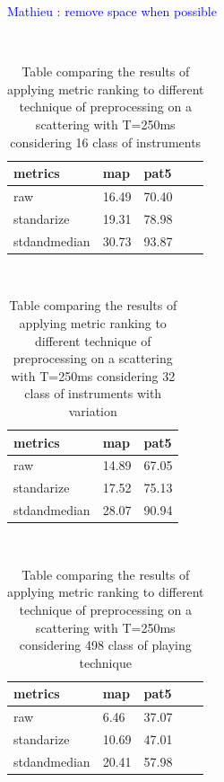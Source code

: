 \documentclass[hidelinks,12pt]{report}
\newcommand{\ml}[1]{\textcolor{blue}{ Mathieu : #1}}
\begin{document}
\ml{remove space when possible}

\begin{table} [H]
\begin{center} 
\ 
 \setlength{\tabcolsep}{.16667em} 
\begin{tabular}{ | l | l | l | l | l |}
metrics & map & pat5  \\ 
\hline 
raw & 16.49 & 70.40  \\ 
standarize & 19.31 & 78.98 \\ 
stdandmedian & 30.73 & 93.87 \\ 
 
\end{tabular} 
\end{center} 
\caption{Table comparing the results of applying metric ranking to different technique of preprocessing on a scattering with T=250ms considering 16 class of instruments} 
\label{you} 
\end{table}

\begin{table}[H]
\begin{center} 
\ 
 \setlength{\tabcolsep}{.16667em} 
\begin{tabular}{|l|l|l|} 
metrics & map & pat5  \\ 
\hline 
raw & 14.89 & 67.05 \\ 
standarize & 17.52 & 75.13  \\ 
stdandmedian & 28.07 & 90.94  \\ 

\end{tabular} 
\end{center} 
\caption{Table comparing the results of applying metric ranking to different technique of preprocessing on a scattering with T=250ms considering 32 class of instruments with variation} 
\label{you} 
\end{table} 


\begin{table} [H]
\begin{center} 
\ 
 \setlength{\tabcolsep}{.16667em} 
\begin{tabular}{ | l | l | l | l | l | }
metrics & map & pat5  \\ 
\hline 
raw &  6.46 & 37.07  \\ 
standarize & 10.69 & 47.01  \\ 
stdandmedian & 20.41 & 57.98  \\ 
\end{tabular} 
\end{center}
\caption{Table comparing the results of applying metric ranking to different technique of preprocessing on a scattering with T=250ms considering 498 class of playing technique}
\end{table}
\end{document}
